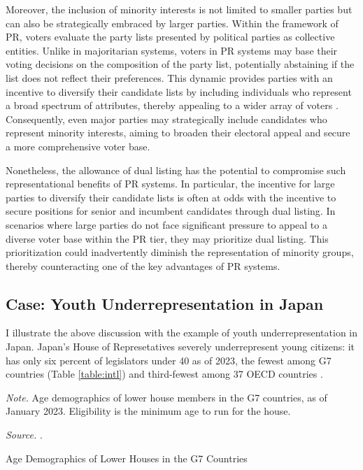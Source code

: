 \documentclass[a4paper, 11pt]{article}
\begin{document}
Moreover, the inclusion of minority interests is not limited to smaller parties but can also be strategically embraced by larger parties. Within the framework of PR, voters evaluate the party lists presented by political parties as collective entities. Unlike in majoritarian systems, voters in PR systems may base their voting decisions on the composition of the party list, potentially abstaining if the list does not reflect their preferences. This dynamic provides parties with an incentive to diversify their candidate lists by including individuals who represent a broad spectrum of attributes, thereby appealing to a wider array of voters \citep[p.188]{norris_electoral_2004}. Consequently, even major parties may strategically include candidates who represent minority interests, aiming to broaden their electoral appeal and secure a more comprehensive voter base.

Nonetheless, the allowance of dual listing has the potential to compromise such representational benefits of PR systems. In particular, the incentive for large parties to diversify their candidate lists is often at odds with the incentive to secure positions for senior and incumbent candidates through dual listing. In scenarios where large parties do not face significant pressure to appeal to a diverse voter base within the PR tier, they may prioritize dual listing. This prioritization could inadvertently diminish the representation of minority groups, thereby counteracting one of the key advantages of PR systems.

\subsection{Case: Youth Underrepresentation in Japan}

I illustrate the above discussion with the example of youth underrepresentation in Japan. Japan's House of Represetatives severely underrepresent young citizens: it has only six percent of legislators under 40 as of 2023, the fewest among G7 countries (Table \ref{table:intl}) and third-fewest among 37 OECD countries \citep{mcclean2020thesis}.

\begin{table}[htbp]
\begin{center}
\begin{threeparttable}

\begin{tablenotes}[flushleft]
  \scriptsize{
    \item{\textit{Note.} Age demographics of lower house members in the G7 countries, as of January 2023. Eligibility is the minimum age to run for the house.}
    \item{\textit{Source.} \citet{ipu2023}.}
  }
\end{tablenotes}
\end{threeparttable}
\caption{Age Demographics of Lower Houses in the G7 Countries}
\label{table:intl}
\end{center}
\end{table}
\end{document}
